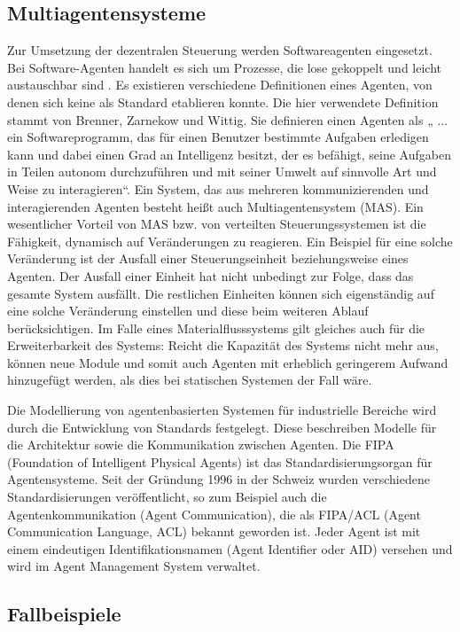 \subsection{Multiagentensysteme}
Zur Umsetzung der dezentralen Steuerung werden Softwareagenten eingesetzt. Bei Software-Agenten handelt es sich um Prozesse, die lose gekoppelt 
und leicht austauschbar sind \cite[vgl.][S. 31-37]{GH:2010}. Es existieren verschiedene Definitionen eines Agenten, von denen sich keine als Standard etablieren konnte. Die hier verwendete Definition stammt von Brenner, Zarnekow und Wittig. Sie definieren einen Agenten als „ ... ein Softwareprogramm,
das für einen Benutzer bestimmte Aufgaben erledigen kann und dabei einen Grad an
Intelligenz besitzt, der es befähigt, seine Aufgaben in Teilen autonom durchzuführen und mit
seiner Umwelt auf sinnvolle Art und Weise zu interagieren“\cite{BZW:1998}. Ein System, das aus mehreren kommunizierenden und interagierenden Agenten besteht heißt auch Multiagentensystem (MAS). Ein wesentlicher Vorteil von MAS bzw. von verteilten Steuerungssystemen ist die Fähigkeit, dynamisch auf Veränderungen zu reagieren. Ein Beispiel für eine solche Veränderung ist der Ausfall einer Steuerungseinheit beziehungsweise eines Agenten. Der Ausfall einer Einheit hat nicht unbedingt zur Folge, dass das gesamte System ausfällt.  Die restlichen Einheiten können sich eigenständig auf eine solche Veränderung einstellen und diese beim weiteren Ablauf berücksichtigen\cite[S. 13]{Roidl:2012}. Im Falle eines Materialflusssystems gilt gleiches auch für die Erweiterbarkeit des Systems: Reicht die Kapazität des Systems nicht mehr aus, können neue Module und somit auch Agenten mit erheblich geringerem Aufwand hinzugefügt werden, als dies bei statischen Systemen der Fall wäre.

Die Modellierung von agentenbasierten Systemen für industrielle Bereiche wird durch die
Entwicklung von Standards festgelegt. Diese beschreiben Modelle für die Architektur
sowie die Kommunikation zwischen Agenten. Die FIPA (Foundation of Intelligent Physical Agents) ist das Standardisierungsorgan für Agentensysteme.
Seit der Gründung 1996 in der Schweiz wurden verschiedene Standardisierungen veröffentlicht, so zum Beispiel auch die Agentenkommunikation (Agent Communication), die als FIPA/ACL (Agent Communication Language, ACL) bekannt geworden ist. Jeder Agent ist mit einem eindeutigen
Identifikationsnamen (Agent Identifier oder AID) versehen und wird im Agent Management System verwaltet\cite[S. 24]{Roidl:2012}.

\subsection{Fallbeispiele}
